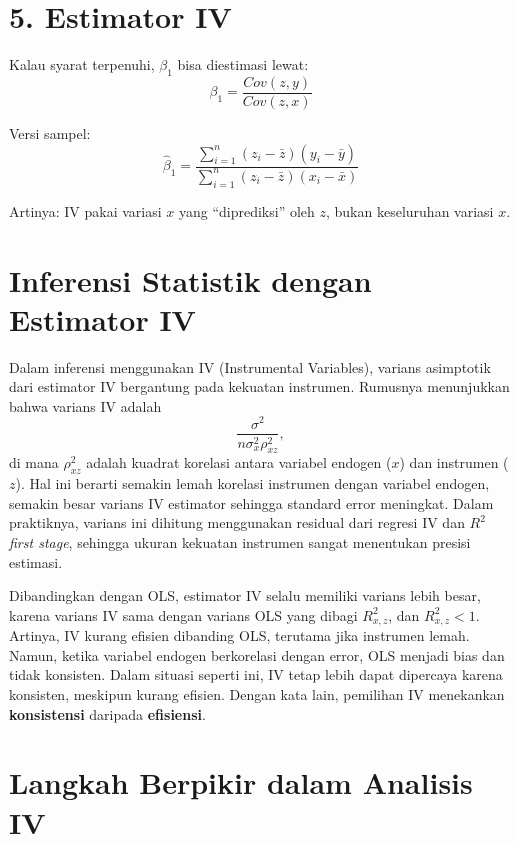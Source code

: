 \documentclass[]{article}
\begin{document}
\section*{5. Estimator IV}
Kalau syarat terpenuhi, $\beta_1$ bisa diestimasi lewat:
\[
\beta_1 = \frac{Cov(z,y)}{Cov(z,x)}
\]

\noindent Versi sampel:
\[
\hat{\beta}_1 = \frac{\sum_{i=1}^{n} (z_i - \bar{z})(y_i - \bar{y})}{\sum_{i=1}^{n} (z_i - \bar{z})(x_i - \bar{x})}
\]

Artinya: IV pakai variasi $x$ yang “diprediksi” oleh $z$, bukan keseluruhan variasi $x$.


\section*{Inferensi Statistik dengan Estimator IV}

Dalam inferensi menggunakan IV (Instrumental Variables), varians asimptotik dari estimator IV bergantung pada kekuatan instrumen. Rumusnya menunjukkan bahwa varians IV adalah 
\[
\frac{\sigma^2}{n \sigma_x^2 \rho_{xz}^2},
\]
di mana $\rho_{xz}^2$ adalah kuadrat korelasi antara variabel endogen ($x$) dan instrumen ($z$). Hal ini berarti semakin lemah korelasi instrumen dengan variabel endogen, semakin besar varians IV estimator sehingga standard error meningkat. Dalam praktiknya, varians ini dihitung menggunakan residual dari regresi IV dan $R^2$ \textit{first stage}, sehingga ukuran kekuatan instrumen sangat menentukan presisi estimasi.

Dibandingkan dengan OLS, estimator IV selalu memiliki varians lebih besar, karena varians IV sama dengan varians OLS yang dibagi $R_{x,z}^2$, dan $R_{x,z}^2 < 1$. Artinya, IV kurang efisien dibanding OLS, terutama jika instrumen lemah. Namun, ketika variabel endogen berkorelasi dengan error, OLS menjadi bias dan tidak konsisten. Dalam situasi seperti ini, IV tetap lebih dapat dipercaya karena konsisten, meskipun kurang efisien. Dengan kata lain, pemilihan IV menekankan \textbf{konsistensi} daripada \textbf{efisiensi}.

\section*{Langkah Berpikir dalam Analisis IV}
\end{document}
